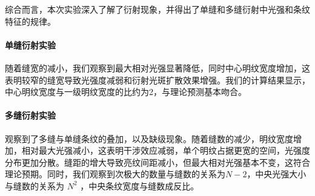 \documentclass[a4paper]{../phyreport}
\begin{document}



综合而言，本次实验深入了解了衍射现象，并得出了单缝和多缝衍射中光强和条纹特征的规律。    
\paragraph{单缝衍射实验}随着缝宽的减小，我们观察到最大相对光强显著降低，同时中心明纹宽度增加，这表明较窄的缝宽导致光强度减弱和衍射光斑扩散效果增强。我们的计算结果显示，中心明纹宽度与一级明纹宽度的比约为2，与理论预测基本吻合。
\paragraph{多缝衍射实验}观察到了多缝与单缝条纹的叠加，以及缺级现象。随着缝数的减少，明纹宽度增加，相对最大光强减小，这表明干涉效应减弱，单个明纹占据更宽的空间，光强度分布更加分散。缝距的增大导致亮纹间距减小，但最大相对光强基本不变，这符合理论预期。同时，我们观察到次极大的数量与缝数的关系为$N-2$，中央光强大小与缝数的关系为 $N^2$ ，中央条纹宽度与缝数成反比。
\end{document}
